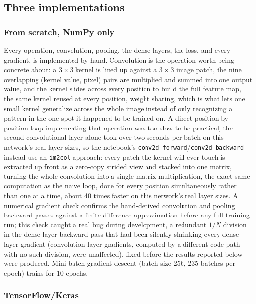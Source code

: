 \documentclass[11pt]{article}
\newcommand{\code}[1]{\texttt{#1}}
\begin{document}
\subsection{Three implementations}

\subsubsection{From scratch, NumPy only}

Every operation, convolution, pooling, the dense layers, the loss, and every
gradient, is implemented by hand. Convolution is the operation worth being
concrete about: a $3\times3$ kernel is lined up against a $3\times3$ image
patch, the nine overlapping (kernel value, pixel) pairs are multiplied and
summed into one output value, and the kernel slides across every position to
build the full feature map, the same kernel reused at every position, weight
sharing, which is what lets one small kernel generalize across the whole
image instead of only recognizing a pattern in the one spot it happened to be
trained on. A direct position-by-position loop implementing that operation
was too slow to be practical, the second convolutional layer alone took over
two seconds per batch on this network's real layer sizes, so the notebook's
\code{conv2d\_forward}/\code{conv2d\_backward} instead use an \code{im2col}
approach: every patch the kernel will ever touch is extracted up front as a
zero-copy strided view and stacked into one matrix, turning the whole
convolution into a single matrix multiplication, the exact same computation
as the naive loop, done for every position simultaneously rather than one at
a time, about 40 times faster on this network's real layer sizes. A numerical
gradient check confirms the hand-derived convolution and pooling backward
passes against a finite-difference approximation before any full training
run; this check caught a real bug during development, a redundant
$1/N$ division in the dense-layer backward pass that had been silently
shrinking every dense-layer gradient (convolution-layer gradients, computed
by a different code path with no such division, were unaffected), fixed
before the results reported below were produced. Mini-batch gradient descent
(batch size 256, 235 batches per epoch) trains for 10 epochs.

\subsubsection{TensorFlow/Keras}
\end{document}
